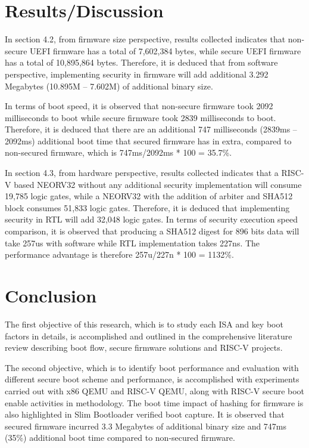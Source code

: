 \documentclass[a4paper,fleqn]{cas-dc}
\begin{document}
\section{ Results/Discussion}
In section 4.2, from firmware size perspective, results collected indicates that non-secure UEFI firmware has a total of 7,602,384 bytes, while secure UEFI firmware has a total of 10,895,864 bytes. Therefore, it is deduced that from software perspective, implementing security in firmware will add additional 3.292 Megabytes (10.895M – 7.602M) of additional binary size.

In terms of boot speed, it is observed that non-secure firmware took 2092 milliseconds to boot while secure firmware took 2839 milliseconds to boot. Therefore, it is deduced that there are an additional 747 milliseconds (2839ms – 2092ms) additional boot time that secured firmware has in extra, compared to non-secured firmware, which is 747ms/2092ms * 100 = 35.7\%.

In section 4.3, from hardware perspective, results collected indicates that a RISC-V based NEORV32 without any additional security implementation will consume 19,785 logic gates, while a NEORV32 with the addition of arbiter and SHA512 block consumes 51,833 logic gates. Therefore, it is deduced that implementing security in RTL will add 32,048 logic gates. In terms of security execution speed comparison, it is observed that producing a SHA512 digest for 896 bits data will take 257us with software while RTL implementation takes 227ns. The performance advantage is therefore 257u/227n * 100 = 1132\%.



\section{ Conclusion}
The first objective of this research, which is to study each ISA and key boot factors in details, is accomplished and outlined in the comprehensive literature review describing boot flow, secure firmware solutions and RISC-V projects.

The second objective, which is to identify boot performance and evaluation with different secure boot scheme and performance, is accomplished with experiments carried out with x86 QEMU and RISC-V QEMU, along with RISC-V secure boot enable activities in methodology. The boot time impact of hashing for firmware is also highlighted in Slim Bootloader verified boot capture. It is observed that secured firmware incurred 3.3 Megabytes of additional binary size and 747ms (35\%) additional boot time compared to non-secured firmware.
\end{document}
